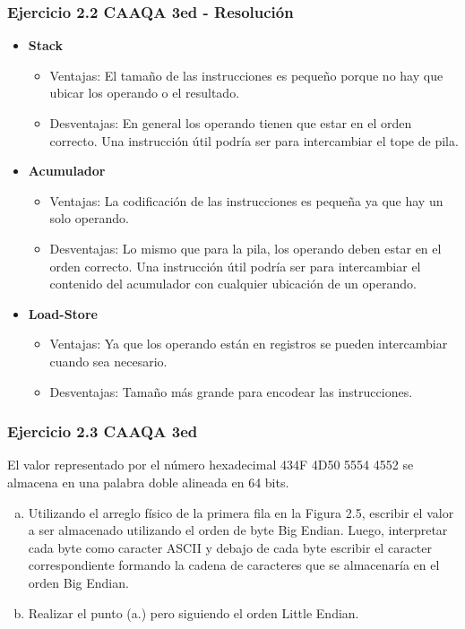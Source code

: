 \documentclass{beamer}
\begin{document}
\begin{frame}
 \frametitle{Ejercicio 2.2 CAAQA 3ed - Resolución}
\begin{itemize}
 \item \textbf{Stack}
  \begin{itemize}
    \item Ventajas: El tamaño de las instrucciones es pequeño porque no hay que ubicar los operando o el resultado.
    \item Desventajas: En general los operando tienen que estar en el orden correcto. Una instrucción útil podría ser para intercambiar el tope de pila.
  \end{itemize}

\item \textbf{Acumulador}
\begin{itemize}
\item Ventajas: La codificación de las instrucciones es pequeña ya que hay un solo operando.
\item Desventajas: Lo mismo que para la pila, los operando deben estar en el orden correcto. Una instrucción útil podría ser para intercambiar el contenido del acumulador con cualquier ubicación de un operando.
\end{itemize}

\item \textbf{Load-Store}
\begin{itemize}
\item Ventajas: Ya que los operando están en registros se pueden intercambiar cuando sea necesario.
\item Desventajas: Tamaño más grande para encodear las instrucciones.
\end{itemize}
\end{itemize}

\end{frame}

\begin{frame}
 \frametitle{Ejercicio 2.3 CAAQA 3ed}
 El valor representado por el número hexadecimal 434F 4D50 5554 4552 se almacena en una palabra doble alineada en 64 bits.

 \begin{enumerate}[a.]
  \item Utilizando el arreglo físico de la primera fila en la Figura 2.5, escribir el valor a ser almacenado utilizando el orden de byte Big Endian. Luego, interpretar cada byte como caracter ASCII y debajo de cada byte escribir el caracter correspondiente formando la cadena de caracteres que se almacenaría en el orden Big Endian.
  
  \item Realizar el punto (a.) pero siguiendo el orden Little Endian.

 \end{enumerate}

\end{frame}
\end{document}
